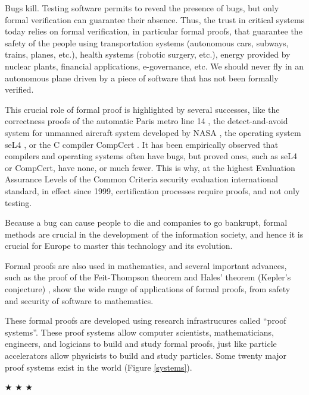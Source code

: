 \thispagestyle{empty}

Bugs kill.  Testing software permits to reveal the presence of bugs,
but only formal verification can guarantee their absence.  Thus, the
trust in critical systems today relies on formal verification, in
particular formal proofs, that guarantee the safety of the people
using transportation systems (autonomous cars, subways, trains,
planes, etc.), health systems (robotic surgery, etc.), energy provided
by nuclear plants, financial applications, e-governance, etc.  We
should never fly in an autonomous plane driven by a piece of software
that has not been formally verified.

This crucial role of formal proof is highlighted by several successes,
like the correctness proofs of the automatic Paris metro line 14
\cite{metro14}, the detect-and-avoid system for unmanned aircraft
system developed by NASA \cite{Munoz16}, the operating system seL4
\cite{Klein09}, or the C compiler CompCert \cite{Leroy06}.  It has
been empirically observed that compilers and operating systems often
have bugs, but proved ones, such as seL4 or CompCert, have none, or
much fewer.  This is why, at the highest Evaluation Assurance Levels
of the Common Criteria security evaluation international standard, in
effect since 1999, certification processes require proofs, and not
only testing.

Because a bug can cause people to die and companies to go bankrupt,
formal methods are crucial in the development of the information
society, and hence it is crucial for Europe to master this technology
and its evolution.

Formal proofs are also used in mathematics, and several important
advances, such as the proof of the Feit-Thompson theorem
\cite{Gonthier13} and Hales' theorem (Kepler's conjecture)
\cite{Hales17}, show the wide range of applications of formal proofs,
from safety and security of software to mathematics.

These formal proofs are developed using research infrastrucures called
``proof systems''.  These proof systems allow computer scientists,
mathematicians, engineers, and logicians to build and study formal
proofs, just like particle accelerators allow physicists to build and
study particles.  Some twenty major proof systems exist in the world
(Figure \ref{systems}).

\begin{center}
  
$\bigstar$ $\bigstar$ $\bigstar$

\end{center}


